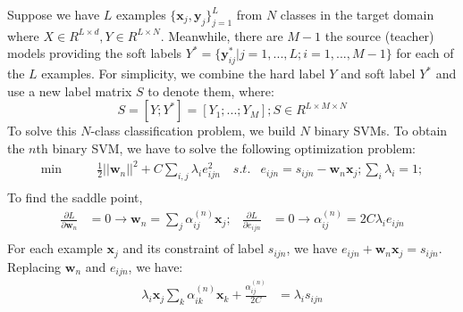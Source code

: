 Suppose we have $L$ examples $\{\textbf{x}_j,\textbf{y}_j\}_{j=1}^L$ from $N$ classes in the target domain where $X\in R^{L\times d}, Y\in R^{L\times N}$. Meanwhile, there are $M-1$ the source (teacher) models providing the soft labels $Y^*=\{\textbf{y}^*_{ij}|j=1,...,L;i=1,...,M-1\}$ for each of the $L$ examples.
For simplicity, we combine the hard label $Y$ and soft label $Y^*$ and use a new label matrix $S$ to denote them, where:
\[S=[Y;Y^*]=[Y_1;...;Y_M]; S \in R^{L\times M \times N}\]
To solve this $N$-class classification problem, we build $N$ binary SVMs.
To obtain the $n$th binary SVM, we have to solve the following optimization problem: 
\begin{equation}\label{eq:multi-distill}
\begin{aligned}
\min \qquad & \frac{1}{2}{|| \textbf{w}_n ||^2} + C\sum_{i,j} \lambda_i{e_{ijn}^2} \quad
s.t. & e_{ijn} = s_{ijn} - \textbf{w}_n\textbf{x}_j;\sum_i\lambda_i=1;\\
\end{aligned}  
\end{equation}
To find the saddle point, 
\begin{equation}
\begin{aligned}
\frac{{\partial L}}{{\partial \textbf{w}_n}}& =0 \rightarrow \textbf{w}_n = \sum_{j}\alpha^{(n)}_{ij} {\textbf{x}_j}; &
\frac{{\partial L}}{{\partial {e_{ijn}}}} & =0 \rightarrow \alpha^{(n)}_{ij} = 2C\lambda_i {e_{ijn}}\\
\end{aligned}
\end{equation}
For each example $\textbf{x}_j$ and its constraint of label $s_{ijn}$, we have $e_{ijn}  + \textbf{w}_n\textbf{x}_j= s_{ijn}$. Replacing $\textbf{w}_n$ and $e_{ijn}$,  we have:  
\begin{equation}
\begin{aligned}
\lambda_i\textbf{x}_j\sum_{k}\alpha^{(n)}_{ik}\textbf{x}_k+\frac{\alpha^{(n)}_{ij}}{2C}&=\lambda_is_{ijn}
\end{aligned}
\end{equation}
